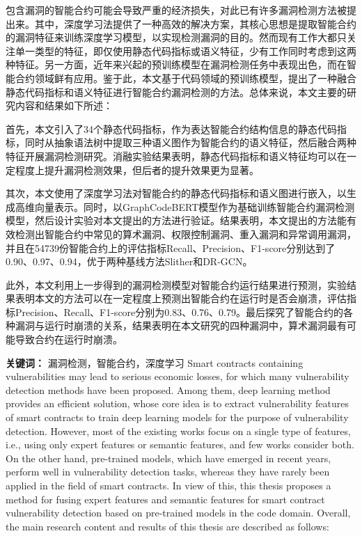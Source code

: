 \cleardoublepage
{}
包含漏洞的智能合约可能会导致严重的经济损失，对此已有许多漏洞检测方法被提出来。其中，深度学习法提供了一种高效的解决方案，其核心思想是提取智能合约的漏洞特征来训练深度学习模型，以实现检测漏洞的目的。然而现有工作大都只关注单一类型的特征，即仅使用静态代码指标或语义特征，少有工作同时考虑到这两种特征。另一方面，近年来兴起的预训练模型在漏洞检测任务中表现出色，而在智能合约领域鲜有应用。鉴于此，本文基于代码领域的预训练模型，提出了一种融合静态代码指标和语义特征进行智能合约漏洞检测的方法。总体来说，本文主要的研究内容和结果如下所述：

首先，本文引入了34个静态代码指标，作为表达智能合约结构信息的静态代码指标，同时从抽象语法树中提取三种语义图作为智能合约的语义特征，然后融合两种特征开展漏洞检测研究。消融实验结果表明，静态代码指标和语义特征均可以在一定程度上提升漏洞检测效果，但后者的提升效果更为显著。

其次，本文使用了深度学习法对智能合约的静态代码指标和语义图进行嵌入，以生成高维向量表示。同时，以GraphCodeBERT模型作为基础训练智能合约漏洞检测模型，然后设计实验对本文提出的方法进行验证。结果表明，本文提出的方法能有效检测出智能合约中常见的算术漏洞、权限控制漏洞、重入漏洞和异常调用漏洞，并且在\num{54739}份智能合约上的评估指标Recall、Precision、F1-score分别达到了0.90、0.97、0.94，优于两种基线方法Slither和DR-GCN。
    
此外，本文利用上一步得到的漏洞检测模型对智能合约运行结果进行预测，实验结果表明本文的方法可以在一定程度上预测出智能合约在运行时是否会崩溃，评估指标Precision、Recall、F1-score分别为0.83、0.76、0.79。最后探究了智能合约的各种漏洞与运行时崩溃的关系，结果表明在本文研究的四种漏洞中，算术漏洞最有可能导致合约在运行时崩溃。


\hspace*{\fill}

\noindent \textbf{关键词：} 漏洞检测，智能合约，深度学习
\cleardoublepage
{}
Smart contracts containing vulnerabilities may lead to serious economic losses, for which many vulnerability detection methods have been proposed. Among them, deep learning method provides an efficient solution, whose core idea is to extract vulnerability features of smart contracts to train deep learning models for the purpose of vulnerability detection. However, most of the existing works focus on a single type of features, i.e., using only expert features or semantic features, and few works consider both. On the other hand, pre-trained models, which have emerged in recent years, perform well in vulnerability detection tasks, whereas they have rarely been applied in the field of smart contracts. In view of this, this thesis proposes a method for fusing expert features and semantic features for smart contract vulnerability detection based on pre-trained models in the code domain. Overall, the main research content and results of this thesis are described as follows:

